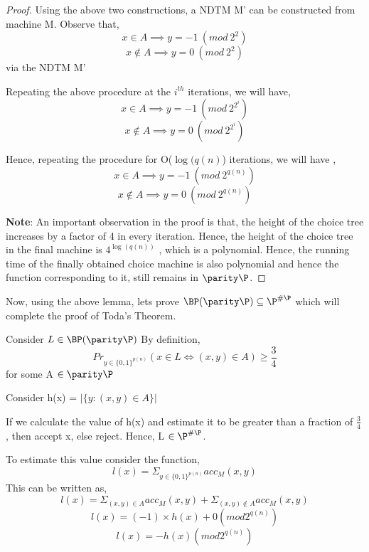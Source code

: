 \documentclass[11pt]{article}
\begin{document}
\begin{proof}
  Using the above two constructions, a NDTM M' can be constructed from machine M. \newline \newline
  Observe that, \newline
   $$x \in A \implies y = -1~(mod~2^{2})$$ 
   $$x \notin A \implies y = 0~(mod~2^{2})$$ 
    via the NDTM M'
    
  Repeating the above procedure at the  $i^{th}$ iterations, we will have,
    $$x \in A \implies y = -1~(mod~2^{2^{i}})$$ 
    $$x \notin A \implies y = 0~(mod~2^{2^{i}})$$ 
    
  Hence, repeating the procedure for O($\log(q(n)$) iterations, we will have ,
    $$x \in A \implies y = -1~(mod~2^{q(n)})$$ 
    $$x \notin A \implies y = 0~(mod~2^{q(n)})$$ 
  
  
  \textbf{Note}: \newline
  An important observation in the proof is that, the height of the choice tree increases by a factor of 4 in every iteration. Hence, the height
  of the choice tree in the final machine is $4^{\log(q(n))}$ , which is a polynomial. Hence, the running time of the finally obtained choice machine
  is also polynomial and hence the function corresponding to it, still remains in $\parity \P$.
\end{proof}

Now, using the above lemma, lets prove $\BP(\parity\P) \subseteq \P^{\#\P}$ which will complete the proof of Toda's Theorem. \newline

Consider $L \in \BP(\parity\P)$ \newline
By definition,
$$ Pr_{y\in \{0,1\}^{p(n)}} (x \in L \Leftrightarrow (x,y) \in A) \geq \frac{3}{4}$$ for some A $\in \parity \P$ \newline

Consider h(x) = $|\{y:(x,y) \in A\}|$ \newline

If we calculate the value of h(x) and estimate it to be greater than a fraction of $\frac{3}{4}$ , then accept x, else reject.\newline
Hence, L $\in \P^{\#\P}$. \newline

To estimate this value consider the function,
$$ l(x) = \Sigma_{y\in \{0,1\}^{p(n)}} acc_{M}(x,y)$$
This can be written as,
$$ l(x) = \Sigma_{(x,y) \in A} acc_{M}(x,y) + \Sigma_{(x,y) \notin A} acc_{M}(x,y)$$
$$ l(x) = (-1) \times h(x) + 0 (mod 2^{q(n)})$$
$$ l(x) = -h(x) (mod 2^{q(n)})$$
\end{document}
